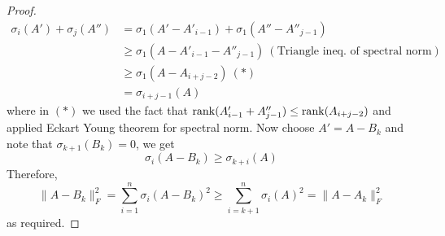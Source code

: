 \documentclass[../book-template.tex]{subfiles}
\begin{document}
\begin{proof}
\begin{align*}
    \sigma_i(A')+\sigma_j(A'') &= \sigma_1(A'-A'_{i-1})+\sigma_1(A''-A''_{j-1})\\
    &\geq \sigma_1(A-A'_{i-1}-A''_{j-1})\ (\text{Triangle ineq. of spectral norm})\\
    &\geq \sigma_1(A-A_{i+j-2})\ (*)\\
    &=\sigma_{i+j-1}(A)
\end{align*}
where in $(*)$ we used the fact that $\operatorname{rank}(A'_{i-1}+A''_{j-1})\leq \operatorname{rank}(A_{i+j-2})$ and applied Eckart Young theorem for spectral norm. Now choose $A'=A-B_k$ and note that $\sigma_{k+1}(B_k)=0$, we get
\begin{equation*}
    \sigma_i(A-B_k)\geq \sigma_{k+i}(A)
\end{equation*}
Therefore,
\begin{equation*}
    \|A-B_k\|_F^2 = \sum_{i=1}^{n}\sigma_i(A-B_k)^2\geq \sum_{i=k+1}^{n}\sigma_i(A)^2 = \|A-A_k\|_F^2
\end{equation*}
as required.
\end{proof}
\end{document}
